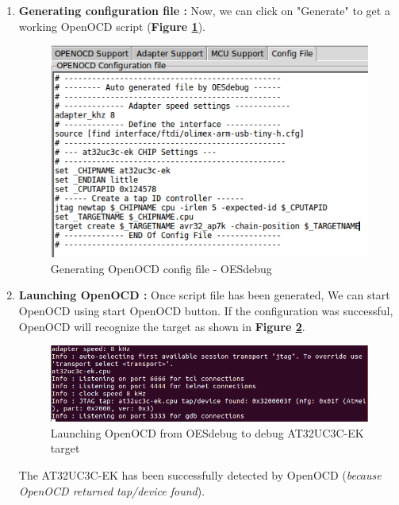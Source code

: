 \begin{enumerate}
\begin{enumerate}
		\item \textbf{Generating configuration file : } Now, we can click on "Generate" to get a working OpenOCD script (\textbf{Figure \ref{Generating OpenOCD config file - OESdebug}}).
		\begin{figure}[H]
			\centering
        	\includegraphics[scale=0.55]{img/solution/OESdebug-generatedScript.png}
        	\caption{Generating OpenOCD config file - OESdebug}
        	\label{Generating OpenOCD config file - OESdebug}
    	\end{figure}		
		
		
		\item \textbf{Launching OpenOCD : } Once script file has been generated, We can start OpenOCD using start OpenOCD button. If the configuration was successful, OpenOCD will recognize the target as shown in \textbf{Figure \ref{Launching OpenOCD from OESdebug on AT32UC3C-EK target}}.		
		\begin{figure}[H]
			\centering
        	\includegraphics[scale=0.60]{img/solution/at32uc3c0512c-found-openocd.png}
        	\caption{Launching OpenOCD from OESdebug to debug AT32UC3C-EK target}
        	\label{Launching OpenOCD from OESdebug on AT32UC3C-EK target}
    	\end{figure}	
	
		The AT32UC3C-EK has been successfully detected by OpenOCD (\textit{because OpenOCD returned \textit{tap/device found}}).
		

\end{enumerate}
\end{enumerate}
